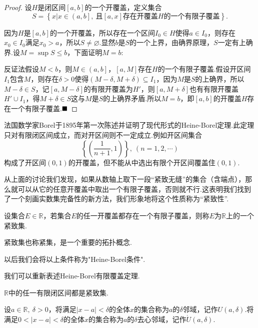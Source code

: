 \begin{proof}
	设$H$是闭区间$\left[a,b\right]$的一个开覆盖，定义集合
	$$S=\left\{x|x\in \left(a,b \right],\ \mbox{且}\left[a,x\right]\mbox{存在开覆盖}H\mbox{的一个有限子覆盖} \right\}.$$
	
	因为$H$是$\left[a,b\right]$的一个开覆盖，所以存在一个区间$I_0\in H$使得$a\in I_0$，则存在$x_0\in I_0$满足$x_0>a$，所以$S\neq\varnothing$.显然$b$是$S$的一个上界，由确界原理，$S$一定有上确界.设$M=\sup S\leqslant b$，下面证明$M=b$:
	
	反证法\qquad 假设$M<b$，则$M\in \left(a,b \right]$，$\left[a,M\right]$存在$H$的一个有限子覆盖.假设开区间$I_1$包含$M$，则存在$\delta >0$使得$(M-\delta,M+\delta)\subseteq I_1$，因为$M$是$S$的上确界，所以$M-\delta\in S$，记$\left[a,M-\delta\right]$的有限开覆盖为$H'$，则$\left[a,M+\delta\right]$也有有限开覆盖$H'\cup I_1$，得$M+\delta\in S$这与$M$是$S$的上确界矛盾.所以$M=b$，即$\left[a,b\right]$的开覆盖$H$存在一个有限子覆盖.$\hfill\blacksquare$
\end{proof}
\begin{remark}
	法国数学家Borel于1895年第一次陈述并证明了现代形式的Heine-Borel定理.此定理只对有限闭区间成立，而对开区间则不一定成立.例如开区间集合$$\left\{(\frac{1}{n+1},1)\right\},\ (n=1,2,\cdots)$$构成了开区间$(0,1)$的开覆盖，但不能从中选出有限个开区间覆盖住$(0,1)$.
\end{remark}
从上面的讨论我们发现，如果从数轴上取下一段“紧致无缝”的集合（含端点），那么就可以从它的任意开覆盖中取出一个有限子覆盖，否则就不行.这表明我们找到了一个刻画实数集完备性的新方法，我们形象地将这个性质称为“紧致性”.
\begin{definition}[紧致集]
	设集合$E\in\mathbb{R}$，若集合$E$的任一开覆盖都存在一个有限子覆盖，则称$E$为$\mathbb{R}$上的一个{\heiti 紧致集}.
\end{definition}
\begin{remark}
	紧致集也称紧集，是一个重要的拓扑概念.
\end{remark}
\begin{remark}
	以后我们会将以上条件称为"Heine-Borel条件".
\end{remark}
我们可以重新表述Heine-Borel有限覆盖定理.
\begin{theorem}
	$\mathbb{R}$中的任一有限闭区间都是紧致集.
\end{theorem}
\begin{definition}[邻域]
	设$a\in\mathbb{R},\ \delta>0$，将满足$\lvert x-a\rvert<\delta$的全体$x$的集合称为{\heiti $a$的$\delta$邻域}，记作$U(a,\delta)$.将满足$0<\lvert x-a\rvert<\delta$的全体$x$的集合称为{\heiti $a$的$\delta$去心邻域}，记作$\mathring{U}(a,\delta)$.
\end{definition}
